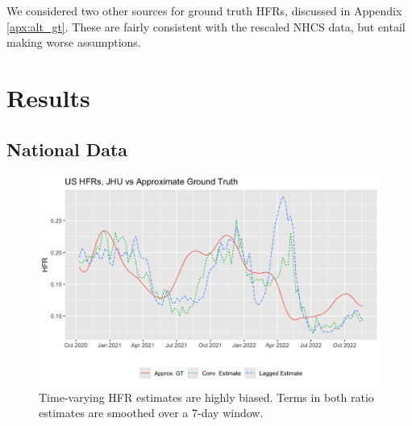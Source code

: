 \documentclass{article}
\begin{document}


We considered two other sources for ground truth HFRs, discussed in Appendix \ref{apx:alt_gt}. These are fairly consistent with the rescaled NHCS data, but entail making worse assumptions. 

\section{Results}\label{sec:results}

\subsection{National Data}\label{sec:results_real}

\begin{figure}
    \centering
    \includegraphics[width=0.8\linewidth]{Figs/US_ests_vs_GT.png}
    \caption{Time-varying HFR estimates are highly biased. Terms in both ratio estimates are smoothed over a 7-day window.}
    \label{fig:basic_est_vs_gt}
\end{figure}
\end{document}
